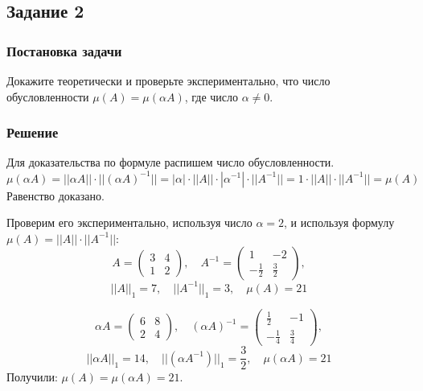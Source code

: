     
    \subsection{Задание 2}
        \subsubsection{Постановка задачи}
            Докажите теоретически и проверьте экспериментально, что число обусловленности $ \mu(A) = \mu(\alpha A) $, где число $ \alpha \neq 0 $.
        
        \subsubsection{Решение}
            Для доказательства по формуле распишем число обусловленности.
            \[
                \mu(\alpha A) = ||\alpha A|| \cdot || (\alpha A)^{-1} || = |\alpha| \cdot ||A|| \cdot |\alpha^{-1}| \cdot || A^{-1} || = 1 \cdot ||A|| \cdot ||A^{-1}|| = \mu(A) 
            \]
            Равенство доказано. 
            
            Проверим его экспериментально, используя число $ \alpha = 2 $, и используя формулу $ \mu(A) = ||A|| \cdot ||A^{-1}|| $:
            \[
                A = \left(
                    \begin{matrix}
                        3 & 4 \\
                        1 & 2
                    \end{matrix}
                \right), \quad
                A^{-1} = \left(
                    \begin{matrix}
                        1 & -2 \\
                        -\frac{1}{2} & \frac{3}{2}
                    \end{matrix}
                \right),
            \]
            \[
                ||A||_1 = 7, \quad
                ||A^{-1}||_1 = 3, \quad
                \mu(A) = 21
            \]

            \[
                \alpha A = \left(
                    \begin{matrix}
                        6 & 8 \\
                        2 & 4
                    \end{matrix}
                \right), \quad
                (\alpha A)^{-1} = \left(
                    \begin{matrix}
                        \frac{1}{2} & -1 \\
                        -\frac{1}{4} & \frac{3}{4}
                    \end{matrix}
                \right),
            \]
            \[
                ||\alpha A||_1 = 14, \quad
                ||(\alpha A^{-1})||_1 = \frac{3}{2}, \quad
                \mu(\alpha A) = 21
            \]
            Получили: $ \mu(A) = \mu(\alpha A) = 21 $.
      
            